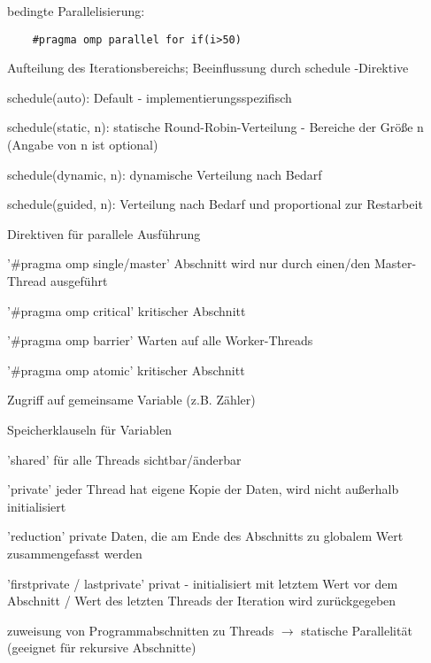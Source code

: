 \documentclass[10pt]{article}
\begin{document}
\begin{itemize*}
\begin{itemize*}
\begin{itemize*}
\begin{lstlisting}
\end{lstlisting}
    \item bedingte Parallelisierung:
    \begin{lstlisting}
    #pragma omp parallel for if(i>50)
\end{lstlisting}
  \end{itemize*}
  \item Aufteilung des Iterationsbereichs; Beeinflussung durch schedule -Direktive
  \begin{itemize*}
    \item schedule(auto): Default - implementierungsspezifisch
    \item schedule(static, n): statische Round-Robin-Verteilung - Bereiche der Größe n (Angabe von n ist optional)
    \item schedule(dynamic, n): dynamische Verteilung nach Bedarf
    \item schedule(guided, n): Verteilung nach Bedarf und proportional zur Restarbeit
  \end{itemize*}
  \item Direktiven für parallele Ausführung
  \begin{itemize*}
    \item '\#pragma omp single/master' Abschnitt wird nur durch einen/den Master-Thread ausgeführt
    \item '\#pragma omp critical' kritischer Abschnitt
    \item '\#pragma omp barrier' Warten auf alle Worker-Threads
    \item '\#pragma omp atomic' kritischer Abschnitt \item Zugriff auf gemeinsame Variable (z.B. Zähler)
  \end{itemize*}
  \item Speicherklauseln für Variablen
  \begin{itemize*}
    \item 'shared' für alle Threads sichtbar/änderbar
    \item 'private' jeder Thread hat eigene Kopie der Daten, wird nicht außerhalb initialisiert
    \item 'reduction' private Daten, die am Ende des Abschnitts zu globalem Wert zusammengefasst werden
    \item 'firstprivate / lastprivate' privat - initialisiert mit letztem Wert vor dem Abschnitt / Wert des letzten Threads der Iteration wird zurückgegeben
  \end{itemize*}
  \item zuweisung von Programmabschnitten zu Threads $\rightarrow$ statische Parallelität (geeignet für rekursive Abschnitte)

\end{itemize*}
\end{itemize*}
\end{document}
